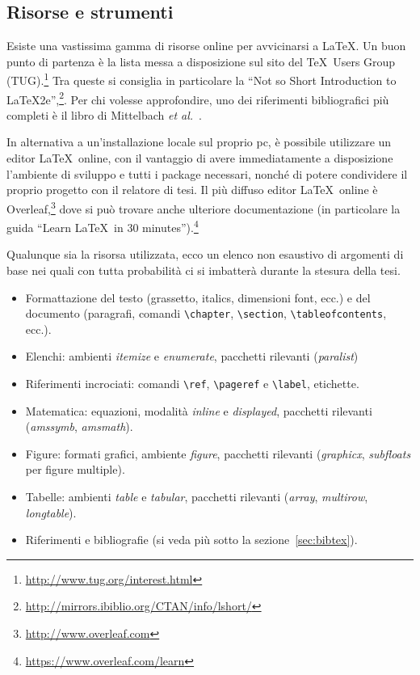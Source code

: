 \documentclass[12pt]{report}
\begin{document}
\subsection{Risorse e strumenti}

Esiste una vastissima gamma di risorse online per avvicinarsi a \LaTeX. Un buon punto di partenza \`e la lista messa a disposizione sul sito del \TeX\ Users Group (TUG).\footnote{\url{http://www.tug.org/interest.html}}
Tra queste si consiglia in particolare la ``Not so Short Introduction to LaTeX2e'',\footnote{\url{http://mirrors.ibiblio.org/CTAN/info/lshort/}}. Per chi volesse approfondire, uno dei riferimenti bibliografici pi\`u completi \`e il libro di Mittelbach {\em et al.}~\cite{mittelbach2004latex}.

In alternativa a un'installazione locale sul proprio pc, \`e possibile utilizzare un editor \LaTeX\ online, con il vantaggio di avere immediatamente a disposizione l'ambiente di sviluppo e tutti i package necessari, nonch\'e di potere condividere il proprio progetto con il relatore di tesi. Il pi\`u diffuso editor \LaTeX\ online \`e Overleaf,\footnote{\url{http://www.overleaf.com}} dove si pu\`o trovare anche ulteriore documentazione (in particolare la guida ``Learn \LaTeX\ in 30 minutes'').\footnote{\url{https://www.overleaf.com/learn}}

Qualunque sia la risorsa utilizzata, ecco un elenco non esaustivo di argomenti di base nei quali con tutta probabilit\`a ci si imbatter\`a durante la stesura della tesi.
\begin{itemize}
\item Formattazione del testo (grassetto, italics, dimensioni font, ecc.) e del documento (paragrafi, comandi \verb|\chapter|, \verb|\section|, \verb|\tableofcontents|, ecc.).
\item Elenchi: ambienti {\em itemize} e {\em enumerate}, pacchetti rilevanti ({\em paralist})
\item Riferimenti incrociati: comandi \verb|\ref|, \verb|\pageref| e \verb|\label|, etichette.
\item Matematica: equazioni, modalit\`a {\em inline} e {\em displayed}, pacchetti rilevanti ({\em amssymb}, {\em amsmath}).
\item Figure: formati grafici, ambiente {\em figure}, pacchetti rilevanti ({\em graphicx}, {\em subfloats} per figure multiple).
\item Tabelle: ambienti {\em table} e {\em tabular}, pacchetti rilevanti ({\em array}, {\em multirow}, {\em longtable}).
\item Riferimenti e bibliografie (si veda pi\`u sotto la sezione~\ref{sec:bibtex}).
\end{itemize}
\end{document}
